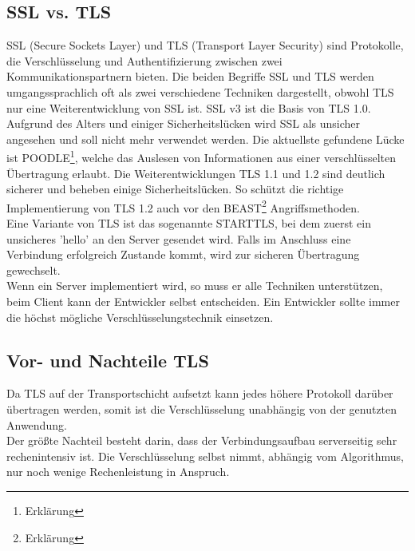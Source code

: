 

\subsection{SSL vs. TLS}
SSL (Secure Sockets Layer) und TLS (Transport Layer Security) sind Protokolle, die Verschlüsselung und Authentifizierung zwischen zwei Kommunikationspartnern bieten. Die beiden Begriffe SSL und TLS werden umgangssprachlich oft als zwei verschiedene Techniken dargestellt, obwohl TLS nur eine Weiterentwicklung von SSL ist. SSL v3 ist die Basis von TLS 1.0. \\
Aufgrund des Alters und einiger Sicherheitslücken wird SSL als unsicher angesehen und soll nicht mehr verwendet werden. Die aktuellste gefundene Lücke ist POODLE\footnote{Erklärung}, welche das Auslesen von Informationen aus einer verschlüsselten Übertragung erlaubt. Die Weiterentwicklungen TLS 1.1 und 1.2 sind deutlich sicherer und beheben einige Sicherheitslücken. So schützt die richtige Implementierung von TLS 1.2 auch vor den BEAST\footnote{Erklärung} Angriffsmethoden.\\
Eine Variante von TLS ist das sogenannte STARTTLS, bei dem zuerst ein unsicheres 'hello' an den Server gesendet wird. Falls im Anschluss eine Verbindung erfolgreich Zustande kommt, wird zur sicheren Übertragung gewechselt. \\
Wenn ein Server implementiert wird, so muss er alle Techniken unterstützen, beim Client kann der Entwickler selbst entscheiden. Ein Entwickler sollte immer die höchst mögliche Verschlüsselungstechnik einsetzen. \\

\subsection{Vor- und Nachteile TLS}
Da TLS auf der Transportschicht aufsetzt kann jedes höhere Protokoll darüber übertragen werden, somit ist die Verschlüsselung unabhängig von der genutzten Anwendung. \\
	Der größte Nachteil besteht darin, dass der Verbindungsaufbau serverseitig sehr rechenintensiv ist. Die Verschlüsselung selbst nimmt, abhängig vom Algorithmus, nur noch wenige Rechenleistung in Anspruch. \\

